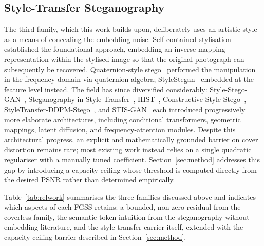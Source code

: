 \documentclass[runningheads]{llncs}
\begin{document}
\subsection{Style-Transfer Steganography}
The third family, which this work builds upon, deliberately uses an artistic style as a means of concealing the embedding noise. Self-contained stylisation~\cite{wacv2020} established the foundational approach, embedding an inverse-mapping representation within the stylised image so that the original photograph can subsequently be recovered. Quaternion-style stego~\cite{quat2021} performed the manipulation in the frequency domain via quaternion algebra; StyleStegan~\cite{stylestegan2023} embedded at the feature level instead. The field has since diversified considerably: Style-Stego-GAN~\cite{sstegogan2024}, Steganography-in-Style-Transfer~\cite{sst2024}, IHST~\cite{ihst2024}, Constructive-Style-Stego~\cite{css2024}, StyleTransfer-DDPM-Stego~\cite{sddpm2025}, and STIS-GAN~\cite{stisgan2026} each introduced progressively more elaborate architectures, including conditional transformers, geometric mappings, latent diffusion, and frequency-attention modules. Despite this architectural progress, an explicit and mathematically grounded barrier on cover distortion remains rare; most existing work instead relies on a single quadratic regulariser with a manually tuned coefficient. Section~\ref{sec:method} addresses this gap by introducing a capacity ceiling whose threshold is computed directly from the desired PSNR rather than determined empirically.

Table~\ref{tab:relwork} summarises the three families discussed above and indicates which aspects of each FGSS retains: a bounded, non-zero residual from the coverless family, the semantic-token intuition from the steganography-without-embedding literature, and the style-transfer carrier itself, extended with the capacity-ceiling barrier described in Section~\ref{sec:method}.
\end{document}

